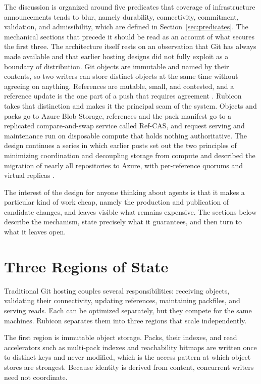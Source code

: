 \documentclass[11pt]{article}
\theoremstyle{definition}
\theoremstyle{plain}
\begin{document}
The discussion is organized around five predicates that coverage of infrastructure announcements tends to blur, namely durability, connectivity, commitment, validation, and admissibility, which are defined in Section~\ref{sec:predicates}. The mechanical sections that precede it should be read as an account of what secures the first three. The architecture itself rests on an observation that Git has always made available and that earlier hosting designs did not fully exploit as a boundary of distribution. Git objects are immutable and named by their contents, so two writers can store distinct objects at the same time without agreeing on anything. References are mutable, small, and contested, and a reference update is the one part of a push that requires agreement \cite{raman2026}. Rubicon takes that distinction and makes it the principal seam of the system. Objects and packs go to Azure Blob Storage, references and the pack manifest go to a replicated compare-and-swap service called Ref-CAS, and request serving and maintenance run on disposable compute that holds nothing authoritative. The design continues a series in which earlier posts set out the two principles of minimizing coordination and decoupling storage from compute \cite{celenza2026} and described the migration of nearly all repositories to Azure, with per-reference quorums and virtual replicas \cite{white2026}.

The interest of the design for anyone thinking about agents is that it makes a particular kind of work cheap, namely the production and publication of candidate changes, and leaves visible what remains expensive. The sections below describe the mechanism, state precisely what it guarantees, and then turn to what it leaves open.

\section{Three Regions of State}

Traditional Git hosting couples several responsibilities: receiving objects, validating their connectivity, updating references, maintaining packfiles, and serving reads. Each can be optimized separately, but they compete for the same machines. Rubicon separates them into three regions that scale independently.

The first region is immutable object storage. Packs, their indexes, and read accelerators such as multi-pack indexes and reachability bitmaps are written once to distinct keys and never modified, which is the access pattern at which object stores are strongest. Because identity is derived from content, concurrent writers need not coordinate.
\end{document}
